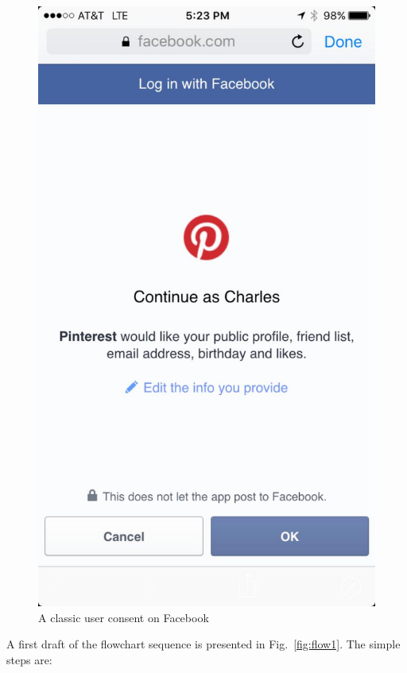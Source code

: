 \vspace{0.5cm}
\begin{figure}[htbp]
    \centering
    \includegraphics[scale=0.45]{chapters/images/chp2/desktopaccess1.jpg}
    \caption{A classic user consent on Facebook}
    \label{fig:usercon1}
\end{figure}

A first draft of the flowchart sequence is presented in Fig.~\ref{fig:flow1}. The simple steps are:

